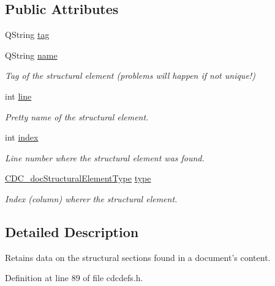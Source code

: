 \subsection*{Public Attributes}
\begin{DoxyCompactItemize}
\item 
Q\+String \hyperlink{struct_c_d_c__doc_structural_element_a1c0b32fc629141e98cbbecc122290b5e}{tag}
\item 
Q\+String \hyperlink{struct_c_d_c__doc_structural_element_a03c24ec8c452b6cb8ccf7ea97f8865c8}{name}
\begin{DoxyCompactList}\small\item\em Tag of the structural element (problems will happen if not unique!) \end{DoxyCompactList}\item 
int \hyperlink{struct_c_d_c__doc_structural_element_a115fdf21a90b5c0bc244a8bd395f061d}{line}
\begin{DoxyCompactList}\small\item\em Pretty name of the structural element. \end{DoxyCompactList}\item 
int \hyperlink{struct_c_d_c__doc_structural_element_a009cc844acc8e5d91cc7185ea8a5aab9}{index}
\begin{DoxyCompactList}\small\item\em Line number where the structural element was found. \end{DoxyCompactList}\item 
\hyperlink{cdcdefs_8h_a6116ba1886594c273c61d425c61d6416}{C\+D\+C\+\_\+doc\+Structural\+Element\+Type} \hyperlink{struct_c_d_c__doc_structural_element_a91d8e46c0feb18a294baababa4318f5e}{type}
\begin{DoxyCompactList}\small\item\em Index (column) wherer the structural element. \end{DoxyCompactList}\end{DoxyCompactItemize}


\subsection{Detailed Description}
Retains data on the structural sections found in a document's content. 

Definition at line 89 of file cdcdefs.\+h.



